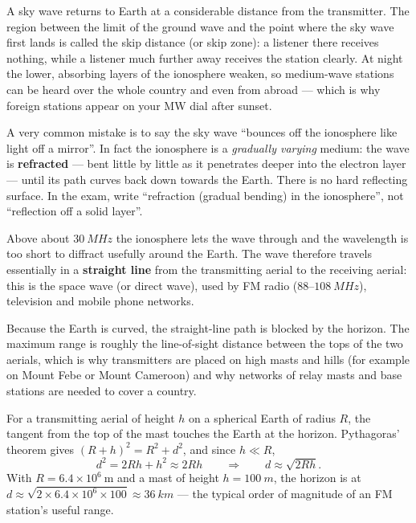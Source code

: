\documentclass[11pt]{article}
\newcommand{\cle}[1]{{\popxbold\color{popdark}#1}}
\newcounter{popsec}
\newcounter{popsub}
\newcommand{\courssub}[1]{%
  \stepcounter{popsub}%
  \par\vspace{9pt}\noindent{\popxbold\fontsize{11.5}{13}\selectfont\color{popink}{\color{poporange}\thepopsec.\thepopsub}\hspace{6pt}#1}\par\nopagebreak\vspace{4pt}
}
\begin{document}
A sky wave returns to Earth at a considerable distance from the transmitter. The region between the limit of the ground wave and the point where the sky wave first lands is called the \cle{skip distance} (or skip zone): a listener there receives nothing, while a listener much further away receives the station clearly. At night the lower, absorbing layers of the ionosphere weaken, so medium-wave stations can be heard over the whole country and even from abroad --- which is why foreign stations appear on your MW dial after sunset.

\begin{attention}
A very common mistake is to say the sky wave ``bounces off the ionosphere like light off a mirror''. In fact the ionosphere is a \emph{gradually varying} medium: the wave is \textbf{refracted} --- bent little by little as it penetrates deeper into the electron layer --- until its path curves back down towards the Earth. There is no hard reflecting surface. In the exam, write ``refraction (gradual bending) in the ionosphere'', not ``reflection off a solid layer''.
\end{attention}

\courssub{Space Wave Propagation: Line of Sight}

Above about $\SI{30}{MHz}$ the ionosphere lets the wave through and the wavelength is too short to diffract usefully around the Earth. The wave therefore travels essentially in a \textbf{straight line} from the transmitting aerial to the receiving aerial: this is the \cle{space wave} (or direct wave), used by FM radio ($88$--$\SI{108}{MHz}$), television and mobile phone networks.

Because the Earth is curved, the straight-line path is blocked by the horizon. The maximum range is roughly the line-of-sight distance between the tops of the two aerials, which is why transmitters are placed on high masts and hills (for example on Mount Febe or Mount Cameroon) and why networks of \cle{relay masts} and base stations are needed to cover a country.

For a transmitting aerial of height $h$ on a spherical Earth of radius $R$, the tangent from the top of the mast touches the Earth at the horizon. Pythagoras' theorem gives $(R+h)^{2} = R^{2} + d^{2}$, and since $h \ll R$,
\[ d^{2} = 2Rh + h^{2} \approx 2Rh \qquad\Longrightarrow\qquad d \approx \sqrt{2Rh}. \]
With $R = 6.4\times 10^{6}\ \mathrm{m}$ and a mast of height $h = \SI{100}{m}$, the horizon is at $d \approx \sqrt{2\times 6.4\times 10^{6}\times 100} \approx \SI{36}{km}$ --- the typical order of magnitude of an FM station's useful range.
\end{document}
